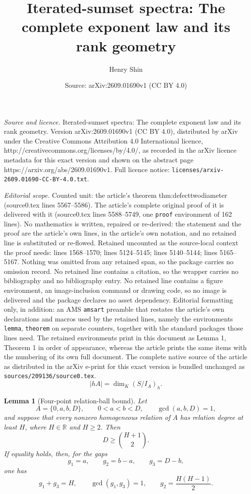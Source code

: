 \documentclass[10pt,a4paper]{amsart}
\title{Iterated-sumset spectra: The complete exponent law and its rank geometry}
\author{Henry Shin}
\date{Source: arXiv:2609.01690v1 (CC BY 4.0)}
\newtheorem{lemma}{Lemma}
\begin{document}
\maketitle

\noindent\emph{Source and licence.} Iterated-sumset spectra: The complete exponent law and its rank geometry. Version arXiv:2609.01690v1 (CC BY 4.0), distributed by arXiv under the Creative Commons Attribution 4.0 International licence, http://creativecommons.org/licenses/by/4.0/, as recorded in the arXiv licence metadata for this exact version and shown on the abstract page https://arxiv.org/abs/2609.01690v1. Full licence notice: \texttt{licenses/arxiv-2609.01690-CC-BY-4.0.txt}.\par\smallskip

\noindent\textit{Editorial scope.} Counted unit: the article's theorem thm:defecttwodiameter (source0.tex lines 5567--5586). The article's complete original proof of it is delivered with it (source0.tex lines 5588--5749, one \texttt{proof} environment of 162 lines). No mathematics is written, repaired or re-derived: the statement and the proof are the article's own lines, in the article's own notation, and no retained line is substituted or re-flowed.  Retained uncounted as the source-local context the proof needs: lines 1568--1570; lines 5124--5145; lines 5140--5144; lines 5165--5167.  Nothing was omitted from any retained span, so the package carries no omission record.  No retained line contains a citation, so the wrapper carries no bibliography and no bibliography entry.  No retained line contains a figure environment, an image-inclusion command or drawing code, so no image is delivered and the package declares no asset dependency.  Editorial formatting only, in addition: an AMS \texttt{amsart} preamble that restates the article's own declarations and macros used by the retained lines, namely the environments \texttt{lemma}, \texttt{theorem} on separate counters, together with the standard packages those lines need.  The retained environments print in this document as Lemma 1, Theorem 1 in order of appearance, whereas the article prints the same items with the numbering of its own full document.  The complete native source of the article as distributed in the arXiv e-print for this exact version is bundled unchanged as \texttt{sources/209136/source0.tex}.
\begin{equation}\label{eq:Hilbert}
 |hA|=\dim_K(S/I_A)_h.
\end{equation}

\begin{lemma}[Four-point relation-ball bound]
\label{lem:fourpoint-relation-ball}
Let
\[
 A=\{0,a,b,D\},\qquad 0<a<b<D,\qquad \gcd(a,b,D)=1,
\]
and suppose that every nonzero homogeneous relation of $A$ has relation
degree at least $H$, where $H\in\mathbb R$ and $H\geq2$.  Then
\[
 D\geq \binom{H+1}{2}.
\]
If equality holds, then, for the gaps
\[
 g_1=a,\qquad g_2=b-a,\qquad g_3=D-b,
\]
one has
\begin{equation}\label{eq:fourpointcriticalgaps}
 g_1+g_3=H,\qquad
 \gcd(g_1,g_3)=1,\qquad
 g_2=\frac{H(H-1)}2.
\end{equation}
\end{lemma}
\end{document}
